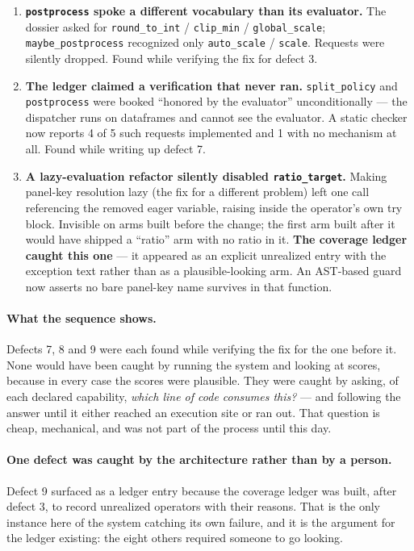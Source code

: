 \documentclass[11pt,a4paper]{article}
\begin{document}
\begin{enumerate}[leftmargin=*]
  \item \textbf{\texttt{postprocess} spoke a different vocabulary than its evaluator.} The
  dossier asked for \texttt{round\_to\_int} / \texttt{clip\_min} / \texttt{global\_scale};
  \texttt{maybe\_postprocess} recognized only \texttt{auto\_scale} / \texttt{scale}. Requests
  were silently dropped. Found while verifying the fix for defect 3.

  \item \textbf{The ledger claimed a verification that never ran.} \texttt{split\_policy} and
  \texttt{postprocess} were booked ``honored by the evaluator'' unconditionally --- the
  dispatcher runs on dataframes and cannot see the evaluator. A static checker now reports 4
  of 5 such requests implemented and 1 with no mechanism at all. Found while writing up
  defect 7.

  \item \textbf{A lazy-evaluation refactor silently disabled \texttt{ratio\_target}.} Making
  panel-key resolution lazy (the fix for a different problem) left one call referencing the
  removed eager variable, raising inside the operator's own try block. Invisible on arms built
  before the change; the first arm built after it would have shipped a ``ratio'' arm with no
  ratio in it. \textbf{The coverage ledger caught this one} --- it appeared as an explicit
  unrealized entry with the exception text rather than as a plausible-looking arm. An
  AST-based guard now asserts no bare panel-key name survives in that function.
\end{enumerate}

\paragraph{What the sequence shows.} Defects 7, 8 and 9 were each found while verifying the
fix for the one before it. None would have been caught by running the system and looking at
scores, because in every case the scores were plausible. They were caught by asking, of each
declared capability, \emph{which line of code consumes this?} --- and following the answer
until it either reached an execution site or ran out. That question is cheap, mechanical, and
was not part of the process until this day.

\paragraph{One defect was caught by the architecture rather than by a person.} Defect 9
surfaced as a ledger entry because the coverage ledger was built, after defect 3, to record
unrealized operators with their reasons. That is the only instance here of the system
catching its own failure, and it is the argument for the ledger existing: the eight others
required someone to go looking.
\end{document}
